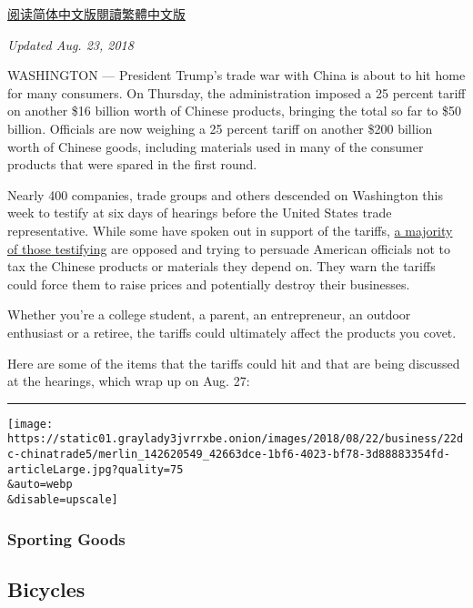 \href{https://cn.nytimes3xbfgragh.onion/business/20180822/trump-china-tariffs-consumers/}{阅读简体中文版}\href{https://cn.nytimes3xbfgragh.onion/business/20180822/trump-china-tariffs-consumers/zh-hant/}{閱讀繁體中文版}

\emph{Updated Aug. 23, 2018}

WASHINGTON --- President Trump's trade war with China is about to hit
home for many consumers. On Thursday, the administration imposed a 25
percent tariff on another \$16 billion worth of Chinese products,
bringing the total so far to \$50 billion. Officials are now weighing a
25 percent tariff on another \$200 billion worth of Chinese goods,
including materials used in many of the consumer products that were
spared in the first round.

Nearly 400 companies, trade groups and others descended on Washington
this week to testify at six days of hearings before the United States
trade representative. While some have spoken out in support of the
tariffs,
\href{https://www.nytimes3xbfgragh.onion/2018/08/20/us/politics/china-tariffs-businesses.html}{a
majority of those testifying} are opposed and trying to persuade
American officials not to tax the Chinese products or materials they
depend on. They warn the tariffs could force them to raise prices and
potentially destroy their businesses.

Whether you're a college student, a parent, an entrepreneur, an outdoor
enthusiast or a retiree, the tariffs could ultimately affect the
products you covet.

Here are some of the items that the tariffs could hit and that are being
discussed at the hearings, which wrap up on Aug. 27:

\begin{center}\rule{0.5\linewidth}{\linethickness}\end{center}

\texttt{[image: https://static01.graylady3jvrrxbe.onion/images/2018/08/22/business/22dc-chinatrade5/merlin\_142620549\_42663dce-1bf6-4023-bf78-3d88883354fd-articleLarge.jpg?quality=75\\\&auto=webp\\\&disable=upscale]}

\hypertarget{sporting-goods}{%
\subsubsection{Sporting Goods}\label{sporting-goods}}

\hypertarget{bicycles}{%
\subsection{Bicycles}\label{bicycles}}

